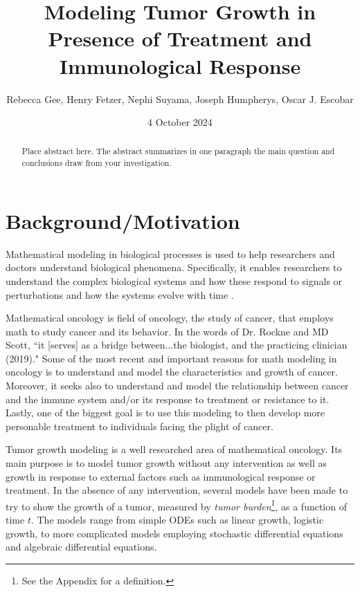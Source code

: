 \documentclass[11pt]{amsart}
\begin{document}
\title{Modeling Tumor Growth in Presence of Treatment and Immunological Response}
\author{Rebecca Gee, Henry Fetzer, Nephi Suyama, Joseph Humpherys, Oscar J. Escobar}

\date{4 October 2024} %

\maketitle %

\begin{abstract}
Place abstract here. The abstract summarizes in one paragraph the main question and conclusions draw from your investigation.
\end{abstract}

\section{Background/Motivation}

Mathematical modeling in biological processes is used to help researchers and doctors understand biological phenomena. 
Specifically, it enables researchers to understand the complex biological systems and how these respond to signals or perturbations and how the systems evolve with time \cite{IntroMathOnc}.


Mathematical oncology is field of oncology, the study of cancer, that employs math to study cancer and its behavior.
In the words of Dr. Rockne and MD Scott, ``it [serves] as a bridge between...the biologist, and the practicing clinician (2019)."
Some of the most recent and important reasons for math modeling in oncology is to understand and model the characteristics and growth of cancer.
Moreover, it seeks also to understand and model the relationship between cancer and the immune system and/or its response to treatment or resistance to it.
Lastly, one of the biggest goal is to use this modeling to then develop more personable treatment to individuals facing the plight of cancer.

Tumor growth modeling is a well researched area of mathematical oncology.
Its main purpose is to model tumor growth without any intervention as well as growth in response to external factors such as immunological response or treatment. 
In the absence of any intervention, several models have been made to try to show the growth of a tumor, measured by \textit{tumor burden}\footnote{See the Appendix for a definition.}, as a function of time $t$.
The models range from simple ODEs such as linear growth, logistic growth, to more complicated models employing stochastic differential equations and algebraic differential equations. 
\end{document}
